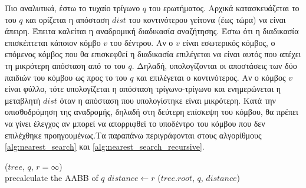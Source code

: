 Πιο αναλυτικά,
έστω το τυχαίο τρίγωνο $q$ του ερωτήματος.
Αρχικά κατασκευάζεται το  του $q$ και ορίζεται 
η απόσταση $dist$ του κοντινότερου γείτονα (έως τώρα) να είναι 
άπειρη. 
Έπειτα καλείται η αναδρομική διαδικασία αναζήτησης.
Έστω ότι η διαδικασία επισκέπτεται
κάποιον κόμβο $v$ του δέντρου. 
Αν ο $v$ είναι εσωτερικός κόμβος, ο επόμενος κόμβος 
που θα επισκεφθεί η διαδικασία επιλέγεται να είναι 
αυτός που απέχει τη μικρότερη απόσταση από το 
του $q$.
Δηλαδή, υπολογίζονται οι αποστάσεις  των 
δύο παιδιών του κόμβου ως προς το  του $q$ και 
επιλέγεται ο κοντινότερος.  
Αν ο κόμβος $v$ είναι φύλλο, τότε υπολογίζεται η απόσταση 
τρίγωνο-τρίγωνο και ενημερώνεται η μεταβλητή $dist$ όταν
η απόσταση που υπολογίστηκε είναι μικρότερη.
Κατά την οπισθοδρόμηση της αναδρομής, δηλαδή στη δεύτερη 
επίσκεψη του κόμβου, θα πρέπει να γίνει έλεγχος αν 
μπορεί να απορριφθεί το υποδέντρο του κόμβου που 
δεν επιλέχθηκε προηγουμένως.Τα παραπάνω περιγράφονται 
στους αλγορίθμους \ref{alg:nearest_search}
και \ref{alg:nearest_search_recursive}. 

\IncMargin{1.5em}
\begin{algorithm}[h]
    \caption[Υπολογισμός Απόστασης Κοντινότερου Γείτονα]{
        }
    \label{alg:nearest_search}
    \DontPrintSemicolon
    \Indm\nonl\nearestsearch($tree$, $q$, $r=\infty$)\\
    \Indp
        precalculate the AABB of $q$ \;
        $distance \gets r$ \;
        \nearestsearchrecur($tree.root$, $q$, $distance$)\;

\end{algorithm}
\DecMargin{1.5em}

